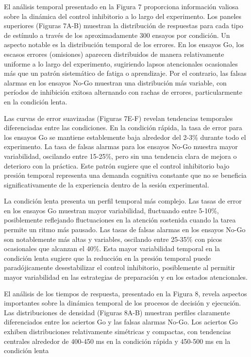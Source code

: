 \documentclass[
  spanish,
  10pt,
]{article}
\begin{document}
El análisis temporal presentado en la Figura 7 proporciona información
valiosa sobre la dinámica del control inhibitorio a lo largo del
experimento. Los paneles superiores (Figuras 7A-B) muestran la
distribución de respuestas para cada tipo de estímulo a través de los
aproximadamente 300 ensayos por condición. Un aspecto notable es la
distribución temporal de los errores. En los ensayos Go, los escasos
errores (omisiones) aparecen distribuidos de manera relativamente
uniforme a lo largo del experimento, sugiriendo lapsos atencionales
ocasionales más que un patrón sistemático de fatiga o aprendizaje. Por
el contrario, las falsas alarmas en los ensayos No-Go muestran una
distribución más variable, con períodos de inhibición exitosa alternando
con rachas de errores, particularmente en la condición lenta.

Las curvas de error suavizadas (Figuras 7E-F) revelan tendencias
temporales diferenciadas entre las condiciones. En la condición rápida,
la tasa de error para los ensayos Go se mantiene establemente baja
alrededor del 2-3\% durante todo el experimento. La tasa de falsas
alarmas para los ensayos No-Go muestra mayor variabilidad, oscilando
entre 15-25\%, pero sin una tendencia clara de mejora o deterioro con la
práctica. Este patrón sugiere que el control inhibitorio bajo presión
temporal representa una demanda cognitiva constante que no se beneficia
significativamente de la experiencia dentro de la sesión experimental.

La condición lenta presenta un perfil temporal más complejo. Las tasas
de error en los ensayos Go muestran mayor variabilidad, fluctuando entre
5-10\%, posiblemente reflejando fluctuaciones en la atención sostenida
cuando la tarea permite un ritmo más pausado. Las tasas de falsas
alarmas en los ensayos No-Go son notablemente más altas y variables,
oscilando entre 25-35\% con picos ocasionales que alcanzan el 40\%. Esta
mayor variabilidad temporal en la condición lenta sugiere que la
reducción en la presión temporal puede paradójicamente desestabilizar el
control inhibitorio, posiblemente al permitir mayor variabilidad en las
estrategias de preparación y en los estados atencionales.

El análisis de los tiempos de respuesta, presentado en la Figura 8,
revela aspectos importantes sobre la dinámica temporal de los procesos
de decisión y ejecución. Las distribuciones de densidad (Figuras 8A-B)
muestran perfiles claramente diferenciados entre los aciertos Go y las
falsas alarmas No-Go. Los aciertos Go exhiben distribuciones
relativamente simétricas y compactas, con tendencias centrales alrededor
de 400-450 ms en la condición rápida y 450-500 ms en la condición lenta
\end{document}
